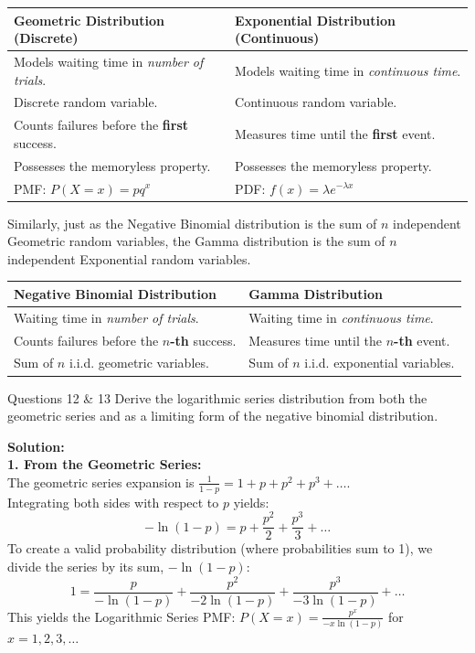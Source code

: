 \documentclass[11pt, a4paper]{article}
\begin{document}
\begin{table}[h!]
\centering
\renewcommand{\arraystretch}{1.3}
\begin{tabular}{p{7cm} p{7cm}}
\toprule
\textbf{Geometric Distribution (Discrete)} & \textbf{Exponential Distribution (Continuous)} \\
\midrule
Models waiting time in \textit{number of trials}. & Models waiting time in \textit{continuous time}. \\
Discrete random variable. & Continuous random variable. \\
Counts failures before the \textbf{first} success. & Measures time until the \textbf{first} event. \\
Possesses the memoryless property. & Possesses the memoryless property. \\
PMF: $P(X=x) = p q^x$ & PDF: $f(x) = \lambda e^{-\lambda x}$ \\
\bottomrule
\end{tabular}
\end{table}

Similarly, just as the Negative Binomial distribution is the sum of $n$ independent Geometric random variables, the Gamma distribution is the sum of $n$ independent Exponential random variables.

\begin{table}[h!]
\centering
\renewcommand{\arraystretch}{1.3}
\begin{tabular}{p{7cm} p{7cm}}
\toprule
\textbf{Negative Binomial Distribution} & \textbf{Gamma Distribution} \\
\midrule
Waiting time in \textit{number of trials}. & Waiting time in \textit{continuous time}. \\
Counts failures before the $n$\textbf{-th} success. & Measures time until the $n$\textbf{-th} event. \\
Sum of $n$ i.i.d. geometric variables. & Sum of $n$ i.i.d. exponential variables. \\
\bottomrule
\end{tabular}
\end{table}

\vspace{0.5cm}
\begin{problem}{Questions 12 \& 13}
Derive the logarithmic series distribution from both the geometric series and as a limiting form of the negative binomial distribution.
\end{problem}

\noindent\textbf{Solution:} \\
\textbf{1. From the Geometric Series:} \\
The geometric series expansion is $\frac{1}{1-p} = 1 + p + p^2 + p^3 + \dots$. \\
Integrating both sides with respect to $p$ yields:
\[ -\ln(1-p) = p + \frac{p^2}{2} + \frac{p^3}{3} + \dots \]
To create a valid probability distribution (where probabilities sum to 1), we divide the series by its sum, $-\ln(1-p)$:
\[ 1 = \frac{p}{-\ln(1-p)} + \frac{p^2}{-2\ln(1-p)} + \frac{p^3}{-3\ln(1-p)} + \dots \]
This yields the Logarithmic Series PMF: $P(X=x) = \frac{p^x}{-x \ln(1-p)}$ for $x = 1, 2, 3, \dots$
\end{document}
